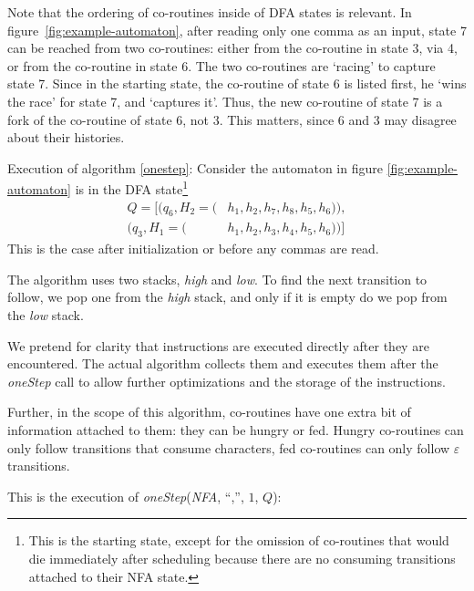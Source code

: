 \documentclass[11pt]{Thesis}
\theoremstyle{definition}
\newcommand{\Figref}[1]{figure~\ref{fig:#1}}
\begin{document}
Note that the ordering of co-routines inside of DFA states is relevant.
In \Figref{example-automaton}, after reading only one comma as an
input, state 7 can be reached from two co-routines: either from the
co-routine in state 3, via 4, or from the co-routine in state 6. The two
co-routines are `racing' to capture state 7. Since in the starting
state, the co-routine of state 6 is listed first, he `wins the race'
for state 7, and `captures it'. Thus, the new co-routine of state 7 is
a fork of the co-routine of state 6, not 3. This matters, since 6 and
3 may disagree about their histories.

\begin{example} Execution of algorithm \ref{onestep}: \label{ex:oneStep1}
Consider the automaton in figure \ref{fig:example-automaton} is in
the DFA state\footnote{This is the starting state, except for the omission of
co-routines that would die immediately after scheduling because there are no
consuming transitions attached to their NFA state.}
\begin{align*}
Q=[
	(q_6, H_2=(&h_1, h_2, h_7,  h_8, h_5, h_6)), \\
	(q_3, H_1=(&h_1, h_2, h_3,  h_4, h_5, h_6))]
	\end{align*}
This is the case after initialization or before any commas are read.

The algorithm uses two stacks, \emph{high} and \emph{low}.
To find the next transition to follow, we pop one from the \emph{high} stack,
and only if it is empty do we pop from the \emph{low} stack.

We pretend for clarity that instructions are executed directly
after they are encountered.  The actual algorithm collects them and
executes them after the \emph{oneStep} call to allow further
optimizations and the storage of the instructions.

Further, in the scope of this algorithm, co-routines have one extra bit of
information attached to them: they can be hungry or fed. Hungry co-routines can
only follow transitions that consume characters, fed co-routines can only
follow $\varepsilon$ transitions.

This is the execution of \emph{oneStep}(\emph{NFA},
``,'', $1$, $Q$):


\end{example}
\end{document}
